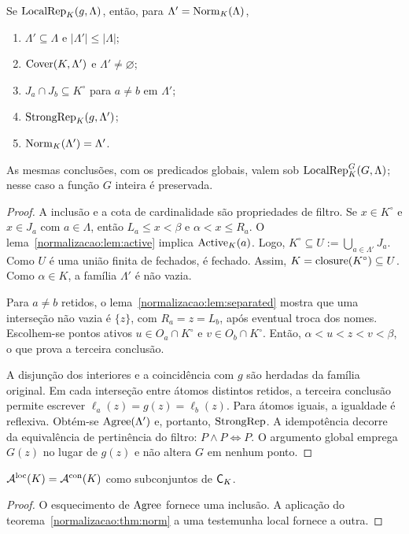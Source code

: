 \begin{teorema}[normalização]\label{map:normalizacao:3.5}\label{normalizacao:thm:norm}
Se $\operatorname{LocalRep}_K(g,\Lambda)$, então, para $\Lambda'=\operatorname{Norm}_K(\Lambda)$,
\begin{enumerate}
\item $\Lambda'\subseteq\Lambda$ e $|\Lambda'|\le|\Lambda|$;
\item $\operatorname{Cover}(K,\Lambda')$ e $\Lambda'\ne\varnothing$;
\item $J_a\cap J_b\subseteq K^\circ$ para $a\ne b$ em $\Lambda'$;
\item $\operatorname{StrongRep}_K(g,\Lambda')$;
\item $\operatorname{Norm}_K(\Lambda')=\Lambda'$.
\end{enumerate}
As mesmas conclusões, com os predicados globais, valem sob
$\operatorname{LocalRep}^G_K(G,\Lambda)$; nesse caso a função $G$ inteira é preservada.
\end{teorema}
\begin{proof}
A inclusão e a cota de cardinalidade são propriedades de filtro.
Se $x\in K^\circ$ e $x\in J_a$ com $a\in\Lambda$, então
$L_a\le x<\beta$ e $\alpha<x\le R_a$. O
lema~\ref{normalizacao:lem:active} implica $\operatorname{Active}_K(a)$. Logo,
$K^\circ\subseteq U:=\bigcup_{a\in\Lambda'}J_a$.
Como $U$ é uma união finita de fechados, é fechado.
Assim, $K=\operatorname{closure}(K^\circ)\subseteq U$. Como $\alpha\in K$,
a família $\Lambda'$ é não vazia.

Para $a\ne b$ retidos, o lema~\ref{normalizacao:lem:separated} mostra que
uma interseção não vazia é $\{z\}$, com
$R_a=z=L_b$, após eventual troca dos nomes. Escolhem-se pontos ativos
$u\in O_a\cap K^\circ$ e $v\in O_b\cap K^\circ$. Então,
$\alpha<u<z<v<\beta$, o que prova a terceira conclusão.

A disjunção dos interiores e a coincidência com $g$ são herdadas da
família original. Em cada interseção entre átomos distintos retidos,
a terceira conclusão permite escrever
$\ell_a(z)=g(z)=\ell_b(z)$. Para átomos iguais, a igualdade é
reflexiva. Obtém-se $\operatorname{Agree}(\Lambda')$ e, portanto, $\operatorname{StrongRep}$.
A idempotência decorre da equivalência de pertinência do filtro:
$P\land P\Longleftrightarrow P$. O argumento global emprega
$G(z)$ no lugar de $g(z)$ e não altera $G$ em nenhum ponto.
\end{proof}

\begin{corolario}\label{map:normalizacao:3.6}\label{normalizacao:cor:classes}
$\mathcal A^{\mathrm{loc}}(K)=\mathcal A^{\mathrm{con}}(K)$ como subconjuntos de $\mathsf C_K$.
\end{corolario}
\begin{proof}
O esquecimento de $\operatorname{Agree}$ fornece uma inclusão. A aplicação do
teorema~\ref{normalizacao:thm:norm} a uma testemunha local fornece a outra.
\end{proof}

